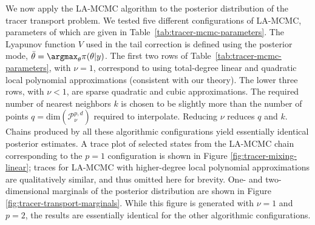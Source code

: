 We now apply the LA-MCMC algorithm to the posterior distribution of the tracer transport problem. We tested five different configurations of LA-MCMC, parameters of which are given in Table~\ref{tab:tracer-mcmc-parameters}. The Lyapunov function $V$ used in the tail correction is defined using the posterior mode, $\bar{\theta} = \argmax_{\theta}{\pi(\theta \vert y)}$. The first two rows of Table~\ref{tab:tracer-mcmc-parameters}, with $\nu =1$, correspond to using total-degree linear and quadratic local polynomial approximations (consistent with our theory). The lower three rows, with $\nu < 1$, are sparse quadratic and cubic approximations. The required number of nearest neighbors $k$ is chosen to be slightly more than the number of points $q = \text{dim}(\mathcal{P}_\nu^{p,d}) $ required to interpolate. 
Reducing $\nu$ reduces $q$ and $k$. Chains produced by all these algorithmic configurations yield essentially identical posterior estimates. A trace plot of selected states from the LA-MCMC chain corresponding to the $p=1$ configuration is shown in  Figure \ref{fig:tracer-mixing-linear}; traces for LA-MCMC with higher-degree local polynomial approximations are qualitatively similar, and thus omitted here for brevity. One- and two-dimensional marginals of the posterior distribution are shown in Figure \ref{fig:tracer-transport-marginals}. While this figure is generated with $\nu=1$ and $p=2$, the results are essentially identical for the other algorithmic configurations.




